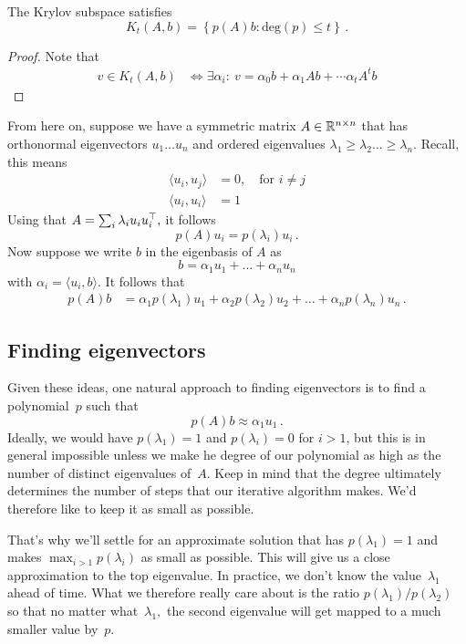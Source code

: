 \begin{fact}
The Krylov subspace satisfies
\[
K_t(A,b) = \left\{ p(A)b : \text{deg}(p) \leq t \right\}\,.
\]
\end{fact}
\begin{proof}
Note that
\begin{align*}
v \in K_t(A,b) &\Longleftrightarrow \exists \alpha_i: \ v= \alpha_0 b + \alpha_1 Ab + \cdots \alpha_t A^tb
\end{align*}
\end{proof}


From here on, suppose we have a symmetric matrix $A \in \mathbb{R}^{n \times n}$ that
has orthonormal eigenvectors $u_1 \ldots u_n$ and ordered eigenvalues $\lambda_1
\geq \lambda_2 \ldots \geq \lambda_n$. Recall, this means
\begin{align*}
    \langle u_i,u_j\rangle &= 0,\quad\text{for } i \neq j\\
    \langle u_i, u_i\rangle &= 1 
\end{align*}
Using that $A=\sum_i \lambda_i u_i u_i^\top,$ it follows
\[
p(A)u_i = p(\lambda_i)u_i\,.
\]
%
Now suppose we write $b$ in the eigenbasis of $A$ as 
\[
b=\alpha_1 u_1 + ... + \alpha_n u_n
\] 
with $\alpha_i = \langle u_i,b\rangle$. It follows that
\begin{align*}
p(A)b &= \alpha_1 p(\lambda_1)u_1 + \alpha_2 p(\lambda_2) u_2 + \ldots +
\alpha_n p(\lambda_n) u_n\,.
\end{align*}
 
\subsection{Finding eigenvectors}
Given these ideas, one natural approach to finding eigenvectors is to find a
polynomial~$p$ such that
\[
p(A)b \approx \alpha_1 u_1\,.
\]
Ideally, we would have $p(\lambda_1) = 1$ and $ p(\lambda_i) = 0$ for $i > 1$,
but this is in general impossible unless we make he degree of our polynomial as
high as the number of distinct eigenvalues of~$A.$ Keep in mind that the degree
ultimately determines the number of steps that our iterative algorithm makes.
We'd therefore like to keep it as small as possible.

That's why we'll settle for an approximate solution that has $p(\lambda_1) = 1$
and makes $\max_{i > 1} p(\lambda_i)$ as small as possible. This will give us a close
approximation to the top eigenvalue. In practice, we don't know the
value~$\lambda_1$ ahead of time. What we therefore really care about is the
ratio $p(\lambda_1)/p(\lambda_2)$ so that no matter what~$\lambda_1,$ the second
eigenvalue will get mapped to a much smaller value by~$p.$ 

